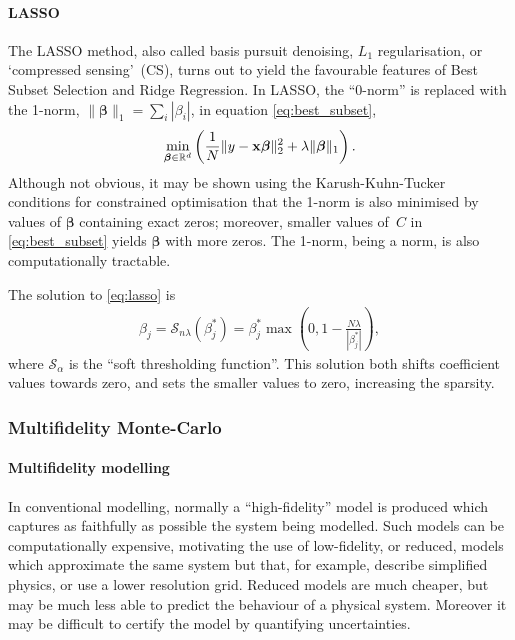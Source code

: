 \paragraph{LASSO}
The LASSO method, also called basis pursuit denoising, $L_1$ regularisation, or
`compressed sensing'~(CS),
turns out to yield the favourable features of
Best Subset Selection and Ridge Regression.
In LASSO, the ``0-norm'' is replaced with the 1-norm, $\|\boldsymbol{\beta}\|_1=\sum_i |\beta_i|$, in equation \eqref{eq:best_subset},
\begin{align}
	\label{eq:lasso}
	\min_{\boldsymbol{\beta}\in \mathbb{R}^d}\left( \frac{1}{N}\|y - \mathbf{x}\boldsymbol{\beta}\|^2_2 + \lambda \|\boldsymbol{\beta}\|_1 \right).
\end{align}
Although not obvious, it may be shown using the Karush-Kuhn-Tucker conditions for constrained optimisation
that the 1-norm is also minimised by values of $\boldsymbol{\beta}$ containing exact zeros;
moreover, smaller values of~$C$ in \eqref{eq:best_subset} yields $\boldsymbol{\beta}$ with more zeros.
The 1-norm, being a norm, is also computationally tractable.

The solution to \eqref{eq:lasso} is
\begin{align}
	\label{eq:lasso_solution}
	\beta_j 
	= \mathcal{S}_{n\lambda}\left(\beta_j^*\right)
	= \beta_j^* \max\left( 0, 1 - \frac{N\lambda}{|\beta_j^*|}\right),
\end{align}
where $\mathcal{S}_{\alpha}$ is the ``soft thresholding function''.
This solution both shifts coefficient values towards zero,
and sets the smaller values to zero, increasing the sparsity.

\subsubsection{Multifidelity Monte-Carlo}\label{sec:mfmc}

\paragraph{Multifidelity modelling}
In conventional modelling, normally a ``high-fidelity'' model is produced which captures
as faithfully as possible the system being modelled.  
Such models can be computationally expensive,
motivating the use of low-fidelity, or reduced, models
which approximate the same system but that, for example,
describe simplified physics, or use a lower resolution grid.
Reduced models are much cheaper,
but may be much less able to predict the behaviour of a physical system.
Moreover it may be difficult to certify the
model by quantifying uncertainties.

